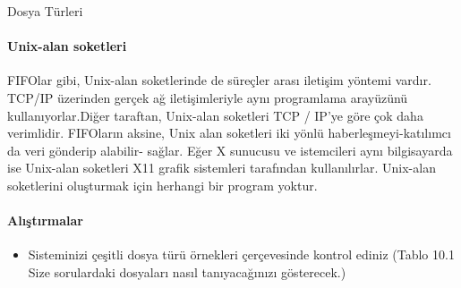 \begin{section}{Dosya Türleri}
\paragraph{Unix-alan soketleri}{FIFOlar gibi, Unix-alan soketlerinde de süreçler arası iletişim yöntemi vardır. TCP/IP üzerinden gerçek ağ iletişimleriyle aynı programlama arayüzünü kullanıyorlar.Diğer taraftan, Unix-alan soketleri TCP / IP'ye göre çok daha verimlidir. FIFOların aksine, Unix alan soketleri iki yönlü haberleşmeyi-katılımcı da veri gönderip alabilir- sağlar. Eğer X sunucusu ve istemcileri aynı bilgisayarda ise Unix-alan soketleri X11 grafik sistemleri tarafından kullanılırlar. Unix-alan soketlerini oluşturmak için herhangi bir program yoktur.}

\paragraph{Alıştırmalar}{
\begin{itemize}
\item Sisteminizi çeşitli dosya türü örnekleri çerçevesinde kontrol ediniz (Tablo 10.1 Size sorulardaki dosyaları nasıl tanıyacağınızı gösterecek.)
\end{itemize}}
\end{section}
